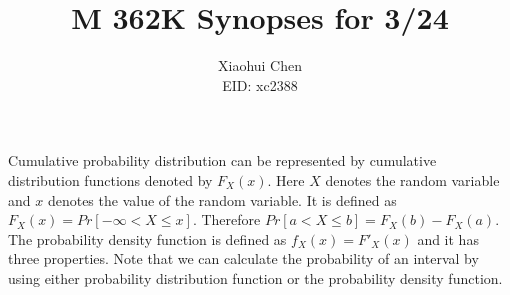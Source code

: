 \documentclass[12pt]{article}
\author{Xiaohui Chen \\EID: xc2388}
\title{M 362K Synopses for 3/24}
\begin{document}
\maketitle
\begin{spacing}{2.0}

Cumulative probability distribution can be represented by cumulative distribution functions denoted by $F_X(x)$. Here $X$ denotes the random variable and $x$ denotes the value of the random variable. It is defined as $F_X(x)= Pr[-\infty < X \le x]$. Therefore $Pr[ a < X \le b]= F_X(b)- F_X(a)$. The probability density function is defined as $f_X(x)= F'_X(x)$ and it has three properties. Note that we can calculate the probability of an interval by using either probability distribution function or the probability density function.

\end{spacing}
\end{document}
